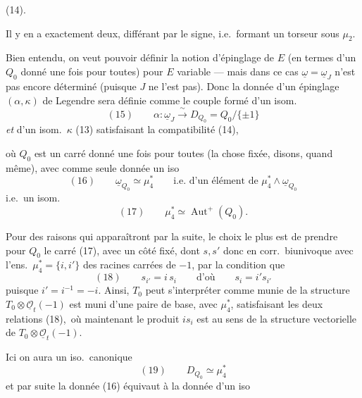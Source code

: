 \documentclass[11pt,a4paper]{article}
\begin{document}
(14).

Il y en a exactement deux, différant par le signe, i.e.\ formant un torseur
sous $\mu_2$.

Bien entendu, on veut pouvoir définir la notion d'épinglage de $E$
(en termes d'un $Q_0$ donné une fois pour toutes) pour
$E$ variable --- mais dans ce cas $\underline{\omega} = \underline{\omega}_J$
n'est pas encore déterminé (puisque $J$ ne l'est pas). Donc la donnée d'un
épinglage $(\alpha, \kappa)$ de Legendre sera définie comme le couple formé
d'un isom.
\[
  (15) \qquad \alpha : \underline{\omega}_J \xrightarrow{\ \sim\ } D_{Q_0} = Q_0/\{\pm 1\}
\]
\emph{et} d'un isom.\ $\kappa$ (13) satisfaisant la compatibilité (14),

où $Q_0$ est un carré donné une fois pour toutes (la chose fixée, disons,
quand même), avec comme seule donnée un iso
\[
  (16) \qquad \underline{\omega}_{Q_0} \simeq \mu_4^*
  \qquad \text{i.e.\ d'un élément de } \mu_4^* \wedge \underline{\omega}_{Q_0}
\]
i.e.\ un isom.
\[
  (17) \qquad \mu_4^* \simeq \operatorname{Aut}^+(Q_0) .
\]

Pour des raisons qui apparaîtront par la suite, le choix le plus
 est de prendre pour $Q_0$ le carré   (17), avec un côté fixé, dont
 
$s, s'$ \struck{\ill{}} donc en corr.\ biunivoque
avec l'ens.\ $\mu_4^* = \{i, i'\}$ des racines carrées de $-1$, par la
condition que
\[
  (18) \qquad s_{i'} = i\, s_i \qquad \text{d'où} \qquad s_i = i' s_{i'}
\]
puisque $i' = i^{-1} = -i$. Ainsi, $T_0$ peut s'interpréter comme munie de
la structure \struck{\ill{}} 
$T_0 \otimes \underline{\mathcal{O}}_t(-1)$ est muni d'une paire de base,
  avec $\mu_4^*$,
satisfaisant les deux relations (18),\ où maintenant le produit $i s_i$
est au sens de la structure vectorielle de
$T_0 \otimes \underline{\mathcal{O}}_t(-1)$. \struck{\ill{}}

Ici on aura un iso.\ canonique
\[
  (19) \qquad D_{Q_0} \simeq \mu_4^*
\]
et par suite la donnée (16) équivaut à la donnée d'un iso
\end{document}
